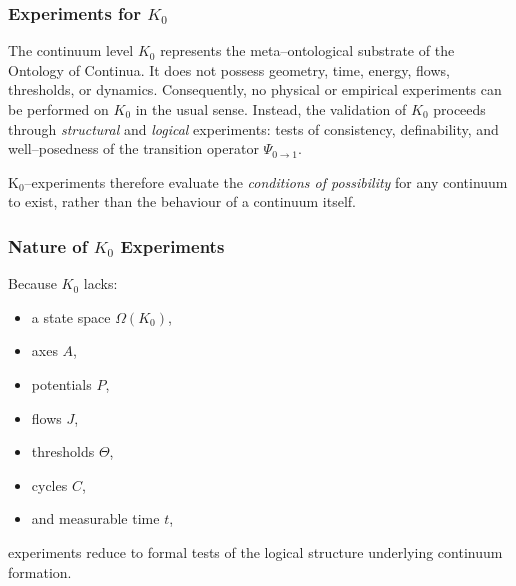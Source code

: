 
\subsubsection{Experiments for \texorpdfstring{$K_0$}{K_0}}
\label{sec:experiments-k0}

The continuum level $K_0$ represents the meta–ontological substrate of the
Ontology of Continua.  
It does not possess geometry, time, energy, flows, thresholds, or dynamics.
Consequently, no physical or empirical experiments can be performed on $K_0$
in the usual sense.  
Instead, the validation of $K_0$ proceeds through \emph{structural} and
\emph{logical} experiments: tests of consistency, definability, and
well–posedness of the transition operator $\Psi_{0\to 1}$.

K$_0$–experiments therefore evaluate the \emph{conditions of possibility} for
any continuum to exist, rather than the behaviour of a continuum itself.


\subsubsection{Nature of \texorpdfstring{$K_0$}{K_0} Experiments}

Because $K_0$ lacks:
\begin{itemize}
    \item a state space $\Omega(K_0)$,
    \item axes $A$,
    \item potentials $P$,
    \item flows $J$,
    \item thresholds $\Theta$,
    \item cycles $C$,
    \item and measurable time $t$,
\end{itemize}
experiments reduce to formal tests of the logical structure underlying
continuum formation.

